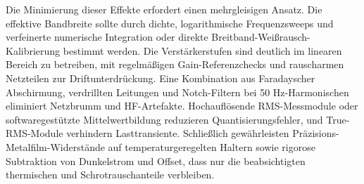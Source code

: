 Die Minimierung dieser Effekte erfordert einen mehrgleisigen Ansatz. 
Die effektive Bandbreite sollte durch dichte, logarithmische Frequenzsweeps und verfeinerte numerische Integration oder direkte Breitband-Weißrausch-Kalibrierung bestimmt werden. 
Die Verstärkerstufen sind deutlich im linearen Bereich zu betreiben, mit regelmäßigen Gain-Referenzchecks und rauscharmen Netzteilen zur Driftunterdrückung. 
Eine Kombination aus Faradayscher Abschirmung, verdrillten Leitungen und Notch-Filtern bei 50 Hz-Harmonischen eliminiert Netzbrumm und HF-Artefakte. 
Hochauflösende RMS-Messmodule oder softwaregestützte Mittelwertbildung reduzieren Quantisierungsfehler, und True-RMS-Module verhindern Lasttransiente. 
Schließlich gewährleisten Präzisions-Metalfilm-Widerstände auf temperaturgeregelten Haltern sowie rigorose Subtraktion von Dunkelstrom und Offset, dass nur die beabsichtigten thermischen und Schrotrauschanteile verbleiben.
